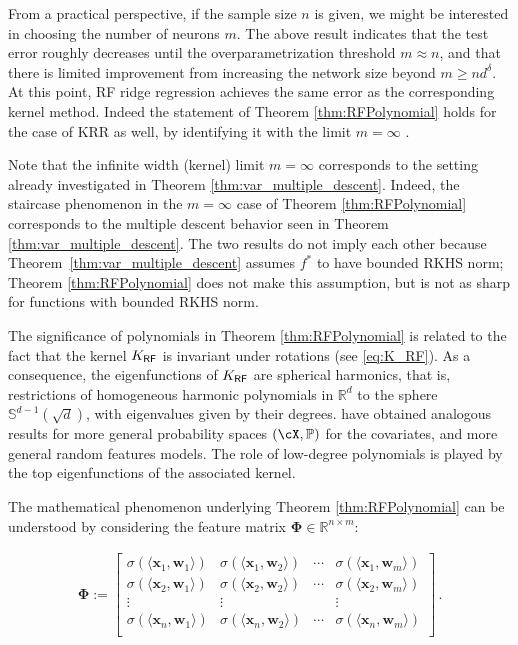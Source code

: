 From a practical perspective, if the sample size $n$ is given, we might be interested in choosing the number of neurons $m$. The above result indicates that the test error roughly decreases until the overparametrization threshold $m\approx n$, and that there is limited improvement from increasing the network size beyond $m\ge nd^{\delta}$.  At this point, RF ridge regression achieves the same error as the corresponding kernel method. Indeed the statement of Theorem \ref{thm:RFPolynomial} holds for the case of KRR as well, by identifying it with the limit $m=\infty$ \cite{ghorbani2020linearized}.

Note that the infinite width (kernel) limit $m=\infty$ corresponds to the setting already investigated in Theorem \ref{thm:var_multiple_descent}. Indeed, the staircase phenomenon in the $m=\infty$ case of Theorem \ref{thm:RFPolynomial}
corresponds to the multiple descent behavior seen in  Theorem \ref{thm:var_multiple_descent}. The two results do not imply each other because  Theorem~\ref{thm:var_multiple_descent} assumes $f^*$ to have bounded RKHS norm;  Theorem \ref{thm:RFPolynomial} does not make this assumption, but is not as sharp for functions with bounded RKHS norm.

The significance of polynomials in Theorem \ref{thm:RFPolynomial} is related to the fact that the kernel $K_{{\sf RF}}$ is invariant under rotations (see \eqref{eq:K_RF}). As a consequence, the eigenfunctions of $K_{{\sf RF}}$ are spherical harmonics, that is, restrictions of homogeneous harmonic polynomials in ${\mathbb R}^d$ to the sphere $\mathbb{S}^{d-1}(\sqrt{d})$,
with eigenvalues given by their degrees. \cite{mei2020generalization} have obtained analogous results for more general probability spaces  $(\cX,\mathbb{P})$ for the covariates, and more general random features models. The role of low-degree polynomials is played by the top eigenfunctions of the associated kernel.

The mathematical phenomenon underlying Theorem \ref{thm:RFPolynomial}
can be understood by considering the feature matrix ${\boldsymbol \Phi}\in {\mathbb R}^{n\times m}$:

\begin{align}
  \label{eq:RF-Phimatrix}
  {\boldsymbol \Phi}:=
  \left[\begin{matrix}
    \sigma(\langle{\boldsymbol x}_1,{\boldsymbol w}_1\rangle) &   \sigma(\langle{\boldsymbol x}_1,{\boldsymbol w}_2\rangle) &   \cdots & \sigma(\langle{\boldsymbol x}_1,{\boldsymbol w}_m\rangle)\\
    \sigma(\langle{\boldsymbol x}_2,{\boldsymbol w}_1\rangle) &   \sigma(\langle{\boldsymbol x}_2,{\boldsymbol w}_2\rangle) &   \cdots & \sigma(\langle{\boldsymbol x}_2,{\boldsymbol w}_m\rangle)\\
    \vdots & \vdots& & \vdots\\
    \sigma(\langle{\boldsymbol x}_n,{\boldsymbol w}_1\rangle) &   \sigma(\langle{\boldsymbol x}_n,{\boldsymbol w}_2\rangle) &   \cdots & \sigma(\langle{\boldsymbol x}_n,{\boldsymbol w}_m\rangle)\\
  \end{matrix}\right]\, .
\end{align}

